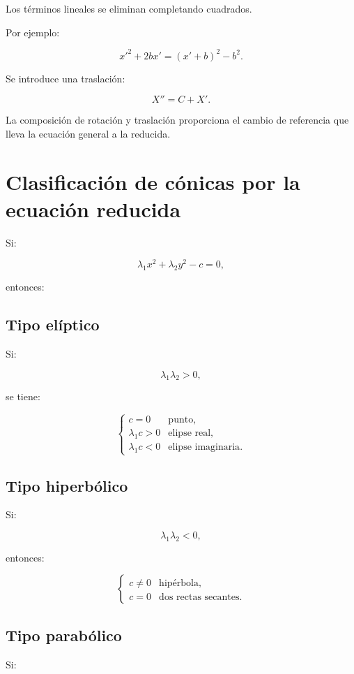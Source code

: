 \documentclass[11pt,a4paper]{article}
\begin{document}
Los términos lineales se eliminan completando cuadrados.

Por ejemplo:

\[
x'^2+2bx'
=
(x'+b)^2-b^2.
\]

Se introduce una traslación:

\[
X''=C+X'.
\]

La composición de rotación y traslación proporciona el cambio de referencia que lleva la ecuación general a la reducida.

\section{Clasificación de cónicas por la ecuación reducida}

Si:

\[
\lambda_1x^2+\lambda_2y^2-c=0,
\]

entonces:

\subsection{Tipo elíptico}

Si:

\[
\lambda_1\lambda_2>0,
\]

se tiene:

\[
\boxed{
\begin{cases}
c=0 & \text{punto},\\
\lambda_1c>0 & \text{elipse real},\\
\lambda_1c<0 & \text{elipse imaginaria}.
\end{cases}
}
\]

\subsection{Tipo hiperbólico}

Si:

\[
\lambda_1\lambda_2<0,
\]

entonces:

\[
\boxed{
\begin{cases}
c\neq0 & \text{hipérbola},\\
c=0 & \text{dos rectas secantes}.
\end{cases}
}
\]

\subsection{Tipo parabólico}

Si:
\end{document}
